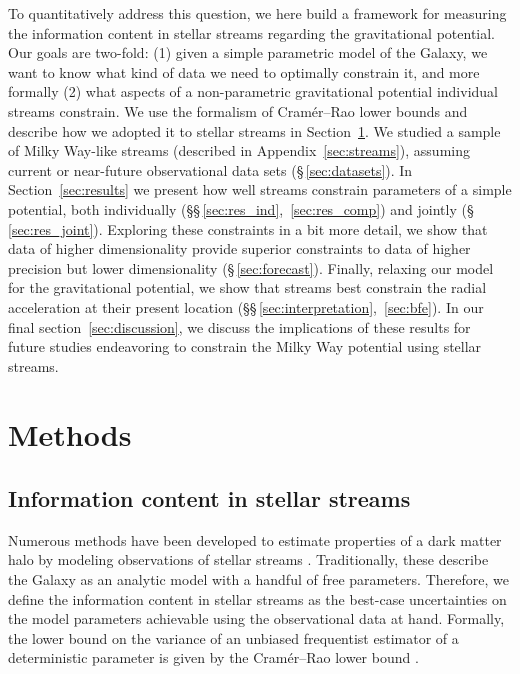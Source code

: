 \documentclass[modern]{aastex62}
\newcommand{\acronym}[1]{{\small{#1}}}
\newcommand{\CRLB}{\acronym{CRLB}}
\begin{document}
To quantitatively address this question, we here build a framework for measuring the information content in stellar streams regarding the gravitational potential.
Our goals are two-fold: (1) given a simple parametric model of the Galaxy, we want to know what kind of data we need to optimally constrain it, and more formally (2) what aspects of a non-parametric gravitational potential individual streams constrain.
We use the formalism of Cram\'er--Rao lower bounds and describe how we adopted it to stellar streams in Section~\ref{sec:method}.
We studied a sample of Milky Way-like streams (described in Appendix~\ref{sec:streams}), assuming current or near-future observational data sets (\S\,\ref{sec:datasets}).
In Section~\ref{sec:results} we present how well streams constrain parameters of a simple potential, both individually (\S\S\,\ref{sec:res_ind},~\ref{sec:res_comp}) and jointly (\S\,\ref{sec:res_joint}).
Exploring these constraints in a bit more detail, we show that data of higher dimensionality provide superior constraints to data of higher precision but lower dimensionality (\S\,\ref{sec:forecast}).
Finally, relaxing our model for the gravitational potential, we show that streams best constrain the radial acceleration at their present location (\S\S\,\ref{sec:interpretation},~\ref{sec:bfe}).
In our final section~\ref{sec:discussion}, we discuss the implications of these results for future studies endeavoring to constrain the Milky Way potential using stellar streams.


\section{Methods}
\label{sec:method}

\subsection{Information content in stellar streams}
Numerous methods have been developed to estimate properties of a dark matter halo by modeling observations of stellar streams \citep[e.g.,][]{varghese2011,sanders2013,bonaca2014,bovy2014,apw2014}.
Traditionally, these describe the Galaxy as an analytic model with a handful of free parameters.
Therefore, we define the information content in stellar streams as the best-case uncertainties on the model parameters achievable using the observational data at hand.
Formally, the lower bound on the variance of an unbiased frequentist estimator of a deterministic parameter is given by the Cram\' er--Rao lower bound \citep[\CRLB,][]{Cramer1946, Rao1945}.
\end{document}

